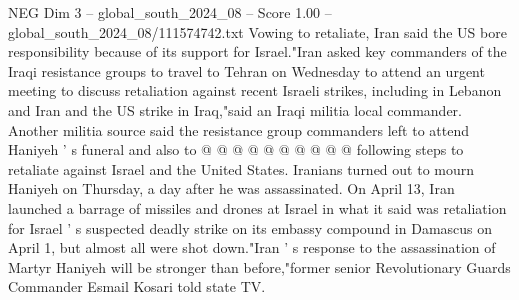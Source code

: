 \begin{textsample}{NEG Dim 3 – global\_south\_2024\_08 – Score 1.00 – global\_south\_2024\_08/111574742.txt}
Vowing to retaliate, Iran said the US bore responsibility because of its support for Israel."Iran asked key commanders of the Iraqi resistance groups to travel to Tehran on Wednesday to attend an urgent meeting to discuss retaliation against recent Israeli strikes, including in Lebanon and Iran and the US strike in Iraq,"said an Iraqi militia local commander.
Another militia source said the resistance group commanders left to attend Haniyeh ' s funeral and also to @ @ @ @ @ @ @ @ @ @ following steps to retaliate against Israel and the United States.
Iranians turned out to mourn Haniyeh on Thursday, a day after he was assassinated.
On April 13, Iran launched a barrage of missiles and drones at Israel in what it said was retaliation for Israel ' s suspected deadly strike on its embassy compound in Damascus on April 1, but almost all were shot down."Iran ' s response to the assassination of Martyr Haniyeh will be stronger than before,"former senior Revolutionary Guards Commander Esmail Kosari told state TV.

\end{textsample}
